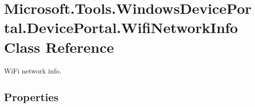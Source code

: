 \hypertarget{class_microsoft_1_1_tools_1_1_windows_device_portal_1_1_device_portal_1_1_wifi_network_info}{}\section{Microsoft.\+Tools.\+Windows\+Device\+Portal.\+Device\+Portal.\+Wifi\+Network\+Info Class Reference}
\label{class_microsoft_1_1_tools_1_1_windows_device_portal_1_1_device_portal_1_1_wifi_network_info}


Wi\+Fi network info.  


\subsection*{Properties}

